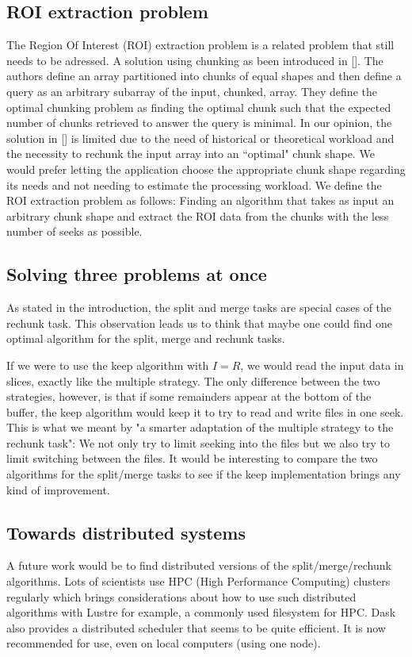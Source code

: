 \documentclass[conference]{IEEEtran}
\begin{document}
\subsection{ROI extraction problem}
The Region Of Interest (ROI) extraction problem is a related problem that still needs
to be adressed. A solution using chunking as been introduced in []. The authors
define an array partitioned into chunks of equal shapes and then define a
query as an arbitrary subarray of the input, chunked, array. They define the
optimal chunking problem as finding the optimal chunk such that the expected
number of chunks retrieved to answer the query is minimal. In our opinion, the
solution in [] is limited due to the need of historical or theoretical workload
and the necessity to rechunk the input array into an ``optimal" chunk shape. We
would prefer letting the application choose the appropriate chunk shape
regarding its needs and not needing to estimate the processing workload. We
define the ROI extraction problem as follows: Finding an algorithm that takes
as input an arbitrary chunk shape and extract the ROI data from the chunks with
the less number of seeks as possible.

\subsection{Solving three problems at once}
As stated in the introduction, the split and merge tasks are special cases of
the rechunk task. This observation leads us to think that maybe one could find
one optimal algorithm for the split, merge and rechunk tasks.

If we were to use the keep algorithm with $I=R$, we would read the input data
in slices, exactly like the multiple strategy. The only difference between the
two strategies, however, is that if some remainders appear at the bottom of the
buffer, the keep algorithm would keep it to try to read and write files in one
seek. This is what we meant by "a smarter adaptation of the multiple strategy
to the rechunk task": We not only try to limit seeking into the files but we
also try to limit switching between the files. It would be interesting to
compare the two algorithms for the split/merge tasks to see if the keep
implementation brings any kind of improvement.

\subsection{Towards distributed systems}
A future work would be to find distributed versions of the split/merge/rechunk
algorithms. Lots of scientists use HPC (High Performance Computing) clusters
regularly which brings considerations about how to use such distributed
algorithms with Lustre for example, a commonly used filesystem for HPC. Dask
also provides a distributed scheduler that seems to be quite efficient. It is
now recommended for use, even on local computers (using one node).
\end{document}
